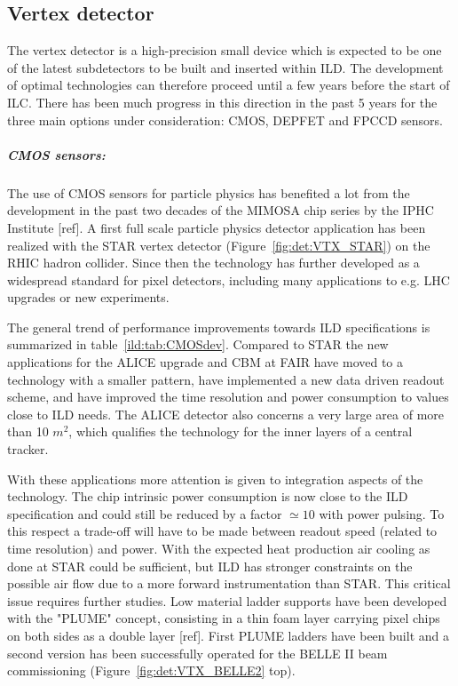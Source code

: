 
\vspace{1.0cm}

\subsection{Vertex detector}

The vertex detector is a high-precision small device which is expected to be one of the latest subdetectors to be built and inserted within ILD. The development of optimal technologies can therefore proceed until a few years before the start of ILC. There has been much progress in this direction in the past 5 years for the three main options under consideration: CMOS, DEPFET and FPCCD sensors.

\subparagraph*{\bf CMOS sensors: }

The use of CMOS sensors for particle physics has benefited a lot from the development in the past two decades of the MIMOSA chip series by the IPHC Institute [ref]. A first full scale particle physics detector application has been realized with the STAR vertex detector (Figure~\ref{fig:det:VTX_STAR}) on the RHIC hadron collider. Since then the technology has further developed as a widespread standard for pixel detectors, including many applications to e.g. LHC upgrades or new experiments. 

The general trend of performance improvements towards ILD specifications is summarized in table~\ref{ild:tab:CMOSdev}. Compared to STAR the new applications for the ALICE upgrade and CBM at FAIR have moved to a technology with a smaller pattern, have implemented a new data driven readout scheme, and have improved the time resolution and power consumption to values close to ILD needs. The ALICE detector also concerns a very large area of more than 10 $m^2$, which qualifies the technology for the inner layers of a central tracker.

With these applications more attention is given to integration aspects of the technology. The chip intrinsic power consumption is now close to the ILD specification and could still be reduced by a factor $\simeq 10$ with power pulsing. To this respect a trade-off will have to be made between readout speed (related to time resolution) and power. With the expected heat production air cooling as done at STAR could be sufficient, but ILD has stronger constraints on the possible air flow due to a more forward instrumentation than STAR. This critical issue requires further studies. Low material ladder supports have been developed with the "PLUME" concept, consisting in a thin foam layer carrying pixel chips on both sides as a double layer [ref]. First PLUME ladders have been built and a second version has been successfully operated for the BELLE II beam commissioning (Figure~\ref{fig:det:VTX_BELLE2} top).

